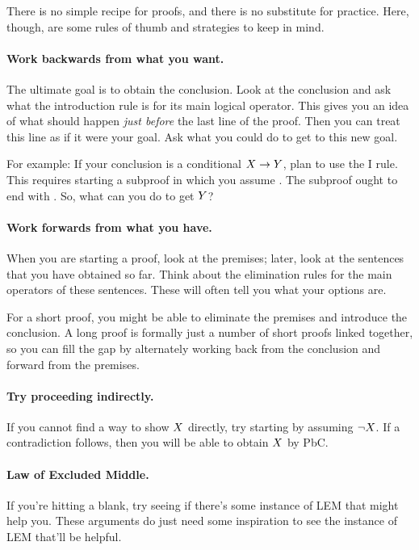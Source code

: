There is no simple recipe for proofs, and there is no substitute for practice. Here, though, are some rules of thumb and strategies to keep in mind.

\paragraph{Work backwards from what you want.}
The ultimate goal is to obtain the conclusion. Look at the conclusion and ask what the introduction rule is for its main logical operator. This gives you an idea of what should happen \emph{just before} the last line of the proof. Then you can treat this line as if it were your goal. Ask what you could do to get to this new goal.

For example: If your conclusion is a conditional $X\rightarrow Y$, plan to use the {\eif}I rule. This requires starting a subproof in which you assume \metaX. The subproof ought to end with \metaY. So, what can you do to get $Y$?

\paragraph{Work forwards from what you have.}
When you are starting a proof, look at the premises; later, look at the sentences that you have obtained so far. Think about the elimination rules for the main operators of these sentences. These will often tell you what your options are.

For a short proof, you might be able to eliminate the premises and introduce the conclusion. A long proof is formally just a number of short proofs linked together, so you can fill the gap by alternately working back from the conclusion and forward from the premises.

\paragraph{Try proceeding indirectly.}
If you cannot find a way to show $X$ directly, try starting by assuming $\neg X$. If a contradiction follows, then you will be able to obtain $X$ by PbC.

\paragraph{Law of Excluded Middle.}
If you're hitting a blank, try seeing if there's some instance of LEM that might help you. These arguments do just need some inspiration to see the instance of LEM that'll be helpful. 

